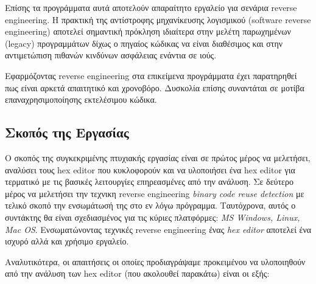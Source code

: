 Επίσης τα προγράμματα αυτά αποτελούν απαραίτητο εργαλείο για σενάρια reverse engineering. 
Η πρακτική της αντίστροφης μηχανίκευσης λογισμικού (software reverse engineering) αποτελεί σημαντική πρόκληση ιδιαίτερα στην μελέτη παρωχημένων (legacy) προγραμμάτων δίχως ο πηγαίος κώδικας να είναι διαθέσιμος και στην αντιμετώπιση πιθανών κινδύνων ασφάλειας ενάντια σε ιούς.

Εφαρμόζοντας reverse engineering στα επικείμενα προγράμματα έχει παρατηρηθεί πως είναι αρκετά απαιτητικό και χρονοβόρο. Δυσκολία επίσης συναντάται σε μοτίβα επαναχρησιμοποίησης εκτελέσιμου κώδικα.

\pagebreak
\subsection{Σκοπός της Εργασίας}
Ο σκοπός της συγκεκριμένης πτυχιακής εργασίας είναι σε πρώτος μέρος να μελετήσει, αναλύσει τους hex editor που κυκλοφορούν και να υλοποιήσει ένα hex editor για τερματικό με τις βασικές λειτουργίες επηρεασμένες από την ανάλυση.
Σε δεύτερο μέρος να μελετήσει την τεχνικη reverse engineering \emph{binary code reuse detection} με τελικό σκοπό την ενσωμάτωσή της στο εν λόγω πρόγραμμα.
Ταυτόχρονα, αυτός ο συντάκτης θα είναι σχεδιασμένος για τις κύριες πλατφόρμες: \emph{MS Windows, Linux, Mac OS}.
Ενσωματώνοντας τεχνικές reverse engineering ένας \emph{hex editor} αποτελεί ένα ισχυρό αλλά και χρήσιμο εργαλείο.

Αναλυτικότερα, οι απαιτήσεις οι οποίες προδιαγράψαμε προκειμένου να υλοποιηθούν από την ανάλυση των hex editor (που ακολουθεί παρακάτω) είναι οι εξής:

